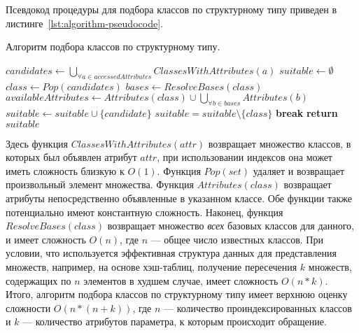 Псевдокод процедуры для подбора классов по структурному типу приведен в
листинге~\ref{lst:algorithm-pseudocode}. 

\begin{algorithm}
  \caption{Алгоритм подбора классов по структурному типу.}
  \label{lst:algorithm-pseudocode}
  \begin{algorithmic}
  \small
    \State $candidates \gets \bigcup_{\forall a \in accessedAttributes}
    ClassesWithAttributes(a)$
    \State $suitable \gets \emptyset$
      \State $class \gets Pop(candidates)$
      \State $bases \gets ResolveBases(class)$
      \State $availableAttributes \gets Attributes(class) \cup \bigcup_{\forall{b} \in bases} Attributes(b)$
        \State $suitable \gets suitable \cup \{candidate\}$
      \EndIf
    \EndWhile
          \State $suitable = suitable \setminus \{ class \}$
          \State \textbf{break}
        \EndIf
      \EndFor
    \EndFor
  \State \textbf{return} $suitable$
  \EndFunction
  \end{algorithmic}
\end{algorithm}


Здесь функция $ClassesWithAttributes(attr)$ возвращает множество классов, в
которых был объявлен атрибут $attr$, при использовании индексов она может иметь
сложность близкую к $O(1)$. Функция $Pop(set)$ удаляет и возвращает произвольный
элемент множества. Функция $Attributes(class)$ возвращает атрибуты
непосредственно объявленные в указанном классе. Обе функции также потенциально
имеют константную сложность. Наконец, функция $ResolveBases(class)$ возвращает
множество \emph{всех} базовых классов для данного, и имеет сложность $O(n)$, где
$n$ --- общее число известных классов. 
При условии, что используется эффективная структура данных для представления
множеств, например, на основе хэш-таблиц, получение пересечения $k$ множеств,
содержащих по $n$ элементов в худшем случае, имеет сложность $O(n*k)$. 
Итого, алгоритм подбора классов по структурному типу имеет верхнюю оценку
сложности $O(n* (n + k))$, где $n$ --- количество проиндексированных классов и
$k$ --- количество атрибутов параметра, к которым происходит обращение.

